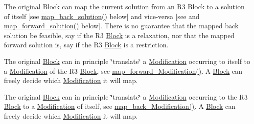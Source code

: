 \begin{Indent}
{\begin{DoxyItemize}
\item The original \mbox{\hyperlink{class_s_m_spp__di__unipi__it_1_1_block}{Block}} can map the current solution from an R3 \mbox{\hyperlink{class_s_m_spp__di__unipi__it_1_1_block}{Block}} to a solution of itself \mbox{[}see \mbox{\hyperlink{class_s_m_spp__di__unipi__it_1_1_block_a04f0a8a608fcc3ded227c2552f67f1a3}{map\+\_\+back\+\_\+solution()}} below\mbox{]} and vice-\/versa \mbox{[}see and \mbox{\hyperlink{class_s_m_spp__di__unipi__it_1_1_block_a7759467d70613a10c1cdb5d3193b4434}{map\+\_\+forward\+\_\+solution()}} below\mbox{]}. There is no guarantee that the mapped back solution be feasible, say if the R3 \mbox{\hyperlink{class_s_m_spp__di__unipi__it_1_1_block}{Block}} is a relaxation, nor that the mapped forward solution is, say if the R3 \mbox{\hyperlink{class_s_m_spp__di__unipi__it_1_1_block}{Block}} is a restriction.
\item The original \mbox{\hyperlink{class_s_m_spp__di__unipi__it_1_1_block}{Block}} can in principle \char`\"{}translate\char`\"{} a \mbox{\hyperlink{class_s_m_spp__di__unipi__it_1_1_modification}{Modification}} occurring to itself to a \mbox{\hyperlink{class_s_m_spp__di__unipi__it_1_1_modification}{Modification}} of the R3 \mbox{\hyperlink{class_s_m_spp__di__unipi__it_1_1_block}{Block}}, see \mbox{\hyperlink{class_s_m_spp__di__unipi__it_1_1_block_a26eeed482e287e1f8a384826c789f9e0}{map\+\_\+forward\+\_\+\+Modification()}}. A \mbox{\hyperlink{class_s_m_spp__di__unipi__it_1_1_block}{Block}} can freely decide which \mbox{\hyperlink{class_s_m_spp__di__unipi__it_1_1_modification}{Modification}} it will map.
\item The original \mbox{\hyperlink{class_s_m_spp__di__unipi__it_1_1_block}{Block}} can in principle \char`\"{}translate\char`\"{} a \mbox{\hyperlink{class_s_m_spp__di__unipi__it_1_1_modification}{Modification}} occurring to the R3 \mbox{\hyperlink{class_s_m_spp__di__unipi__it_1_1_block}{Block}} to a \mbox{\hyperlink{class_s_m_spp__di__unipi__it_1_1_modification}{Modification}} of itself, see \mbox{\hyperlink{class_s_m_spp__di__unipi__it_1_1_block_a9524f314b064aafbd8d2f8a398b797a2}{map\+\_\+back\+\_\+\+Modification()}}. A \mbox{\hyperlink{class_s_m_spp__di__unipi__it_1_1_block}{Block}} can freely decide which \mbox{\hyperlink{class_s_m_spp__di__unipi__it_1_1_modification}{Modification}} it will map.
\end{DoxyItemize}

}
\end{Indent}
